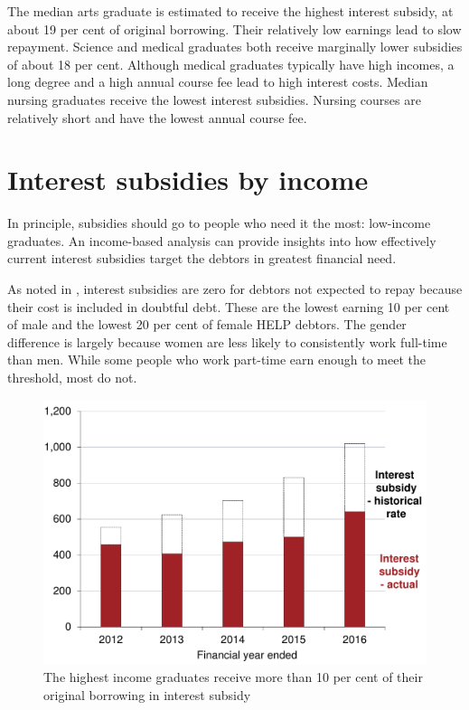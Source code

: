 \documentclass[embargoed]{grattan}
\begin{document}
{The median arts graduate is estimated to receive the highest interest subsidy, at about 19 per cent of original borrowing.
Their relatively low earnings lead to slow repayment.
Science and medical graduates both receive marginally lower subsidies of about 18 per cent.
Although medical graduates typically have high incomes, a long degree and a high annual course fee lead to high interest costs.
Median nursing graduates receive the lowest interest subsidies.
Nursing courses are relatively short and have the lowest annual course fee.

\section{Interest subsidies by income}\label{sec:interest-subsidies-by-income}

In principle, subsidies should go to people who need it the most: low-income graduates.
An income-based analysis can provide insights into how effectively current interest subsidies target the debtors in greatest financial need.

As noted in , interest subsidies are zero for debtors not expected to repay because their cost is included in doubtful debt.
These are the lowest earning 10 per cent of male and the lowest 20 per cent of female \gls{HELP} debtors.
The gender difference is largely because women are less likely to consistently work full-time than men.
While some people who work part-time earn enough to meet the threshold, most do not.

\begin{figure}
\caption{The highest income graduates receive more than 10 per cent of their original borrowing in interest subsidy}\label{fig:fig10-highest-income-grads-receive-over-10pc-original-borrowing-interest-subsidy}

\includegraphics[page=10]{atlas/Chartpack.pdf}


\end{figure}}
\end{document}
